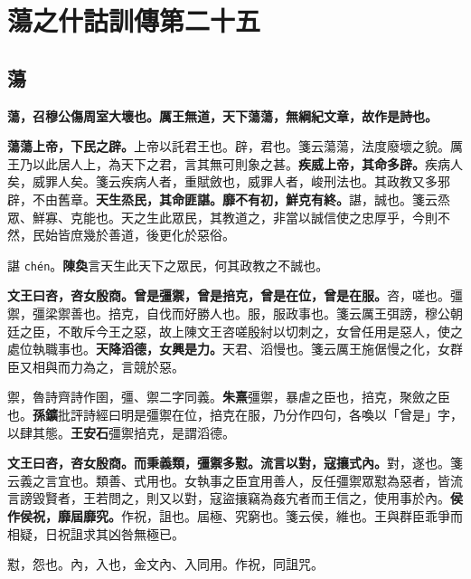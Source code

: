 \chapter{蕩之什詁訓傳第二十五}

\section{蕩}


\textbf{蕩，召穆公傷周室大壞也。厲王無道，天下蕩蕩，無綱紀文章，故作是詩也。}

\textbf{蕩蕩上帝，下民之辟。}{\footnotesize 上帝以託君王也。辟，君也。箋云蕩蕩，法度廢壞之貌。厲王乃以此居人上，為天下之君，言其無可則象之甚。}\textbf{疾威上帝，其命多辟。}{\footnotesize 疾病人矣，威罪人矣。箋云疾病人者，重賦斂也，威罪人者，峻刑法也。其政教又多邪辟，不由舊章。}\textbf{天生烝民，其命匪諶。靡不有初，鮮克有終。}{\footnotesize 諶，誠也。箋云烝眾、鮮寡、克能也。天之生此眾民，其教道之，非當以誠信使之忠厚乎，今則不然，民始皆庶幾於善道，後更化於惡俗。}

\begin{quoting}諶 \texttt{chén}。\textbf{陳奐}言天生此天下之眾民，何其政教之不誠也。\end{quoting}

\textbf{文王曰咨，咨女殷商。曾是彊禦，曾是掊克，曾是在位，曾是在服。}{\footnotesize 咨，嗟也。彊禦，彊梁禦善也。掊克，自伐而好勝人也。服，服政事也。箋云厲王弭謗，穆公朝廷之臣，不敢斥今王之惡，故上陳文王咨嗟殷紂以切刺之，女曾任用是惡人，使之處位執職事也。}\textbf{天降滔德，女興是力。}{\footnotesize 天君、滔慢也。箋云厲王施倨慢之化，女群臣又相與而力為之，言競於惡。}

\begin{quoting}禦，魯詩齊詩作圉，彊、禦二字同義。\textbf{朱熹}彊禦，暴虐之臣也，掊克，聚斂之臣也。\textbf{孫鑛}批評詩經曰明是彊禦在位，掊克在服，乃分作四句，各喚以「曾是」字，以肆其態。\textbf{王安石}彊禦掊克，是謂滔德。\end{quoting}

\textbf{文王曰咨，咨女殷商。而秉義類，彊禦多懟。流言以對，寇攘式內。}{\footnotesize 對，遂也。箋云義之言宜也。類善、式用也。女執事之臣宜用善人，反任彊禦眾懟為惡者，皆流言謗毀賢者，王若問之，則又以對，寇盜攘竊為姦宄者而王信之，使用事於內。}\textbf{侯作侯祝，靡屆靡究。}{\footnotesize 作祝，詛也。屆極、究窮也。箋云侯，維也。王與群臣乖爭而相疑，日祝詛求其凶咎無極已。}

\begin{quoting}懟，怨也。內，入也，金文內、入同用。作祝，同詛咒。\end{quoting}

